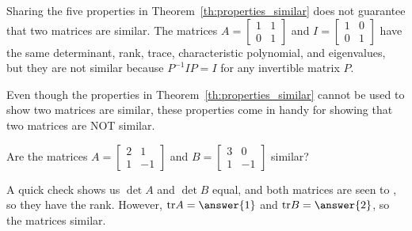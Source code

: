 \documentclass{ximera}
\begin{document}
 
\begin{remark}\label{rem:fivePropSim}
Sharing the five properties in Theorem~\ref{th:properties_similar} does not guarantee that two matrices are similar. The matrices
$A = \begin{bmatrix}
1 & 1 \\
0 & 1
\end{bmatrix}$ and $I = \begin{bmatrix}
1 & 0 \\
0 & 1
\end{bmatrix}$ have the same determinant, rank, trace, characteristic polynomial, and eigenvalues, but they are not similar because $P^{-1}IP = I$ for any invertible matrix $P$.
\end{remark}
 
Even though the properties in Theorem~\ref{th:properties_similar} cannot be used to show two matrices are similar, these properties come in handy for showing that two matrices are NOT similar.
 
\begin{example}\label{ex:areTheySimilar}
Are the matrices $A =
\begin{bmatrix}
2 & 1 \\
1 & -1
\end{bmatrix}$ and $B =
\begin{bmatrix}
3 & 0 \\
1 & -1
\end{bmatrix}$ similar?
\begin{explanation}
A quick check shows us $\det A$ and $\det B$  equal, and both matrices are seen to , so they have the  rank.  However, $\mbox{tr} A = \answer{1}$ and $\mbox{tr} B = \answer{2}$, so the matrices  similar.
\end{explanation}
\end{example}
 
\end{document}
